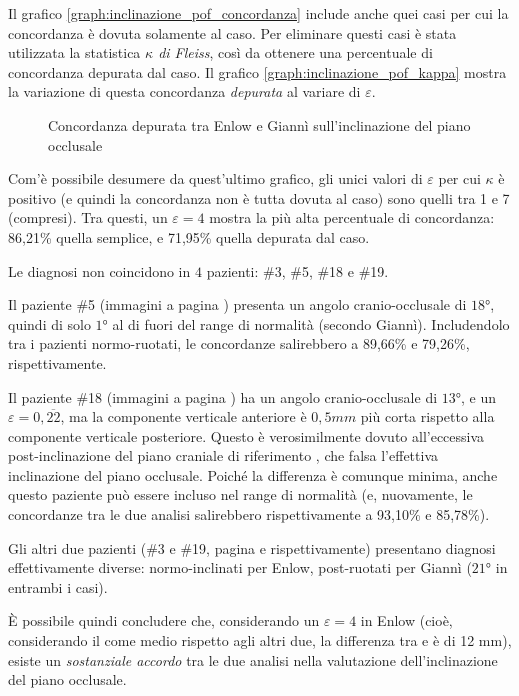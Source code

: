 Il grafico \ref{graph:inclinazione_pof_concordanza} include anche quei casi per cui la concordanza è dovuta solamente al caso. Per eliminare questi casi è stata utilizzata la statistica \emph{$\kappa$ di Fleiss}, così da ottenere una percentuale di concordanza depurata dal caso. Il grafico \vref{graph:inclinazione_pof_kappa} mostra la variazione di questa concordanza \emph{depurata} al variare di $\varepsilon$.

\begin{figure}[ht!]
\centering

\caption{Concordanza depurata tra Enlow e Giannì sull'inclinazione del piano occlusale}
\label{graph:inclinazione_pof_kappa}
\end{figure}

Com'è possibile desumere da quest'ultimo grafico, gli unici valori di $\varepsilon$ per cui $\kappa$ è positivo (e quindi la concordanza non è tutta dovuta al caso) sono quelli tra 1 e 7 (compresi). Tra questi, un $\varepsilon = 4$ mostra la più alta percentuale di concordanza: 86,21\% quella semplice, e 71,95\% quella depurata dal caso.

Le diagnosi non coincidono in $4$ pazienti: \#3, \#5, \#18 e \#19.

Il paziente \#5 (immagini a pagina \pageref{paz:EMALO2001}) presenta un angolo cranio-occlusale di $18°$, quindi di solo $1°$ al di fuori del range di normalità (secondo Giannì). Includendolo tra i pazienti normo-ruotati, le concordanze salirebbero a 89,66\% e 79,26\%, rispettivamente.

Il paziente \#18 (immagini a pagina \pageref{paz:TILO1999}) ha un angolo cranio-occlusale di $13°$, e un $\varepsilon = 0,\overline{22}$, ma la componente verticale anteriore è $0,5 mm$ più corta rispetto alla componente verticale posteriore. Questo è verosimilmente dovuto all'eccessiva post-inclinazione del piano craniale di riferimento , che falsa l'effettiva inclinazione del piano occlusale. Poiché la differenza è comunque minima, anche questo paziente può essere incluso nel range di normalità (e, nuovamente, le concordanze tra le due analisi salirebbero rispettivamente a 93,10\% e 85,78\%).

Gli altri due pazienti (\#3 e \#19, pagina \pageref{paz:MASCHI2000} e \pageref{paz:ELITRI1998} rispettivamente) presentano diagnosi effettivamente diverse: normo-inclinati per Enlow, post-ruotati per Giannì ($21°$ in entrambi i casi).

È possibile quindi concludere che, considerando un $\varepsilon = 4$ in Enlow (cioè, considerando il  come medio rispetto agli altri due, la differenza tra  e  è di 12 mm), esiste un \emph{sostanziale accordo} tra le due analisi nella valutazione dell'inclinazione del piano occlusale.